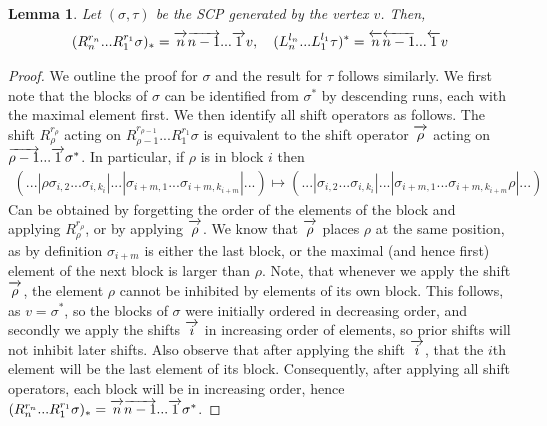 \documentclass{amsart}
\newtheorem{lemma}[theorem]{Lemma}
\theoremstyle{definition}
\newcommand{\rightshift}[1]{\overrightarrow{\vphantom{1}{#1}}}
\newcommand{\leftshift}[1]{\overleftarrow{\vphantom{1}{#1}}}
\begin{document}
\begin{lemma}\label{lem: minimal vertex formulae}
Let $(\sigma,\tau)$ be the SCP generated by the vertex $v$.
Then,
\begin{align*}
    (R^{r_n}_{n}...R^{r_{1}}_{1}\sigma)_*= \rightshift{n} \rightshift{n-1}...\rightshift{1} v, \quad
    (L^{l_n}_{n}...L^{l_{1}}_{1}\tau)^* =\leftshift{n} \leftshift{n-1}...\leftshift{1} v
\end{align*}
\end{lemma}
\begin{proof}
We outline the proof for $\sigma$ and the result for $\tau$ follows similarly.
We first note that the blocks of $\sigma$ can be identified from $\sigma^*$ by descending runs, each with the maximal element first.
We then identify all shift operators as follows.
The shift $R_\rho^{r_\rho}$ acting on $R^{r_{\rho-1}}_{\rho-1}...R^{r_{1}}_{1}\sigma$ is equivalent to the shift operator  $\rightshift{\rho}$ acting on $\rightshift{\rho-1}...\rightshift{1} \sigma^*$.
In particular, if $\rho$ is in block $i$ then
\begin{align*}
    (...|\rho\sigma_{i,2}...\sigma_{i,k_i}|...|\sigma_{i+m,1}...\sigma_{i+m,k_{i+m}}|...) \mapsto (...| \sigma_{i,2}...\sigma_{i,k_i}|...|\sigma_{i+m,1}...\sigma_{i+m,k_{i+m}} \rho|...)
\end{align*}
Can be obtained by forgetting the order of the elements of the block and applying $R_\rho^{r_\rho}$, or by applying $\rightshift{\rho}$.
We know that $\rightshift{\rho}$ places $\rho$ at the same position, as by definition $\sigma_{i+m}$ is either the last block, or the maximal (and hence first) element of the next block is larger than $\rho$.
Note, that whenever we apply the shift $\rightshift{\rho}$, the element $\rho$ cannot be inhibited by elements of its own block. 
This follows, as $v=\sigma^*$, so the blocks of $\sigma$ were initially ordered in decreasing order, and secondly we apply the shifts $\rightshift{i}$ in increasing order of elements, so prior shifts will not inhibit later shifts.
Also observe that after applying the shift $\rightshift{i}$, that the $i$th element will be the last element of its block. Consequently, after applying all shift operators, each block will be in increasing order, hence $(R^{r_n}_{n}...R^{r_{1}}_{1}\sigma)_*= \rightshift{n} \rightshift{n-1}...\rightshift{1} \sigma^*$.
\end{proof}
\end{document}
